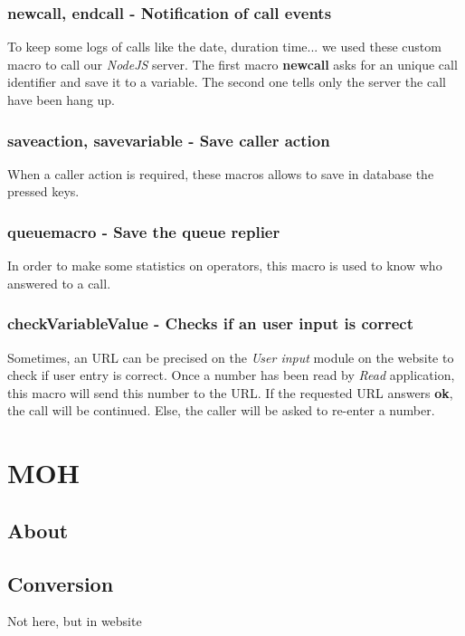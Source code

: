 \subsubsection{newcall, endcall - Notification of call events}
To keep some logs of calls like the date, duration time... we used these custom macro to call our \textit{NodeJS} server.
The first macro \textbf{newcall} asks for an unique call identifier and save it to a variable. 
The second one tells only the server the call have been hang up.

\subsubsection{saveaction, savevariable - Save caller action}
When a caller action is required, these macros allows to save in database the pressed keys.

\subsubsection{queuemacro - Save the queue replier}
In order to make some statistics on operators, this macro is used to know who answered to a call.

\subsubsection{checkVariableValue - Checks if an user input is correct}
Sometimes, an URL can be precised on the \textit{User input} module on the website to check if user entry is correct. Once a number has been read by \textit{Read} application, this macro will send this number to the URL. If the requested URL answers \textbf{ok}, the call will be continued. Else, the caller will be asked to re-enter a number.




\section{MOH}
\subsection{About}


\subsection{Conversion}
Not here, but in website 






